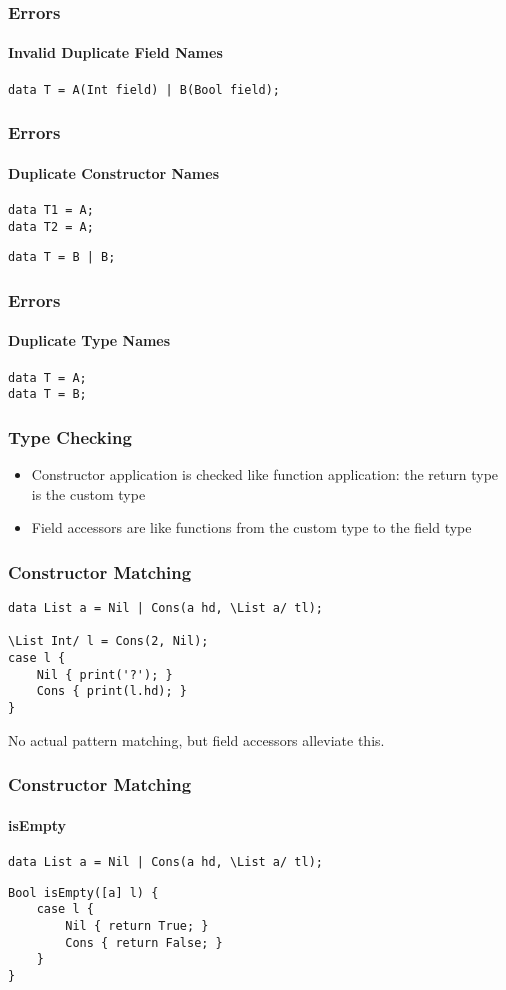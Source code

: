 \documentclass[12pt]{beamer}
\begin{document}
\begin{frame}[fragile]
    \frametitle{Errors}
    \framesubtitle{Invalid Duplicate Field Names}
    \begin{verbatim}
data T = A(Int field) | B(Bool field);\end{verbatim}
\end{frame}

\begin{frame}[fragile]
    \frametitle{Errors}
    \framesubtitle{Duplicate Constructor Names}
    \begin{verbatim}
data T1 = A;
data T2 = A;\end{verbatim}
    \begin{verbatim}
data T = B | B;\end{verbatim}
\end{frame}

\begin{frame}[fragile]
    \frametitle{Errors}
    \framesubtitle{Duplicate Type Names}
    \begin{verbatim}
data T = A;
data T = B;\end{verbatim}
\end{frame}

\begin{frame}
    \frametitle{Type Checking}
    \begin{itemize}
        \item Constructor application is checked like function application: the return type is the custom type
        \item Field accessors are like functions from the custom type to the field type
    \end{itemize}
\end{frame}

\begin{frame}[fragile]
    \frametitle{Constructor Matching}
    \begin{verbatim}
data List a = Nil | Cons(a hd, \List a/ tl);

\List Int/ l = Cons(2, Nil);
case l {
    Nil { print('?'); }
    Cons { print(l.hd); }
}\end{verbatim}
    No actual pattern matching, but field accessors alleviate this.
\end{frame}

\begin{frame}[fragile]
    \frametitle{Constructor Matching}
    \framesubtitle{isEmpty}
    \begin{verbatim}
data List a = Nil | Cons(a hd, \List a/ tl);\end{verbatim}

\begin{verbatim}
Bool isEmpty([a] l) {
    case l {
        Nil { return True; }
        Cons { return False; }
    }
}\end{verbatim}
\end{frame}
\end{document}
